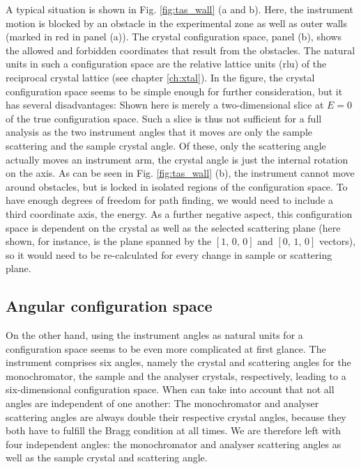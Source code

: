 A typical situation is shown in Fig. \ref{fig:tas_wall} (a and b). 
Here, the instrument motion is blocked by an obstacle in the experimental zone
as well as outer walls (marked in red in panel (a)).
The crystal configuration space, panel (b), shows the allowed and forbidden
coordinates that result from the obstacles. The natural units in such a
configuration space are the relative lattice units (rlu) of the reciprocal
crystal lattice (see chapter \ref{ch:xtal}).
In the figure, the crystal configuration space seems to be simple enough for 
further consideration, but it has several disadvantages: Shown here is merely
a two-dimensional slice at $E = 0$ of the true configuration space.
Such a slice is thus not sufficient for a full analysis as the two instrument
angles that it moves are only the sample scattering and the sample crystal angle.
Of these, only the scattering angle actually moves an instrument arm, the crystal
angle is just the internal rotation on the axis.
As can be seen in Fig. \ref{fig:tas_wall} (b), the instrument cannot move
around obstacles, but is locked in isolated regions of the configuration space.
To have enough degrees of freedom for path finding, we would need to include
a third coordinate axis, the energy.
As a further negative aspect, this configuration space is dependent on the 
crystal as well as the selected scattering plane (here shown, for instance, 
is the plane spanned by the $\left[1,\,0,\,0\right]$ and $\left[0,\,1,\,0\right]$ 
vectors), so it would need to be re-calculated for every change in sample or 
scattering plane.


\subsection{Angular configuration space}
On the other hand, using the instrument angles as natural units for a configuration
space seems to be even more complicated at first glance. 
The instrument comprises six angles, namely the crystal and 
scattering angles for the monochromator, the sample and the analyser crystals, 
respectively, leading to a six-dimensional configuration space. 
When can take into account that not all angles are independent of one another:
The monochromator and analyser scattering angles are always double their 
respective crystal angles, because they both have to fulfill the Bragg condition
at all times. 
We are therefore left with four independent angles: the monochromator and analyser
scattering angles as well as the sample crystal and scattering angle. 

